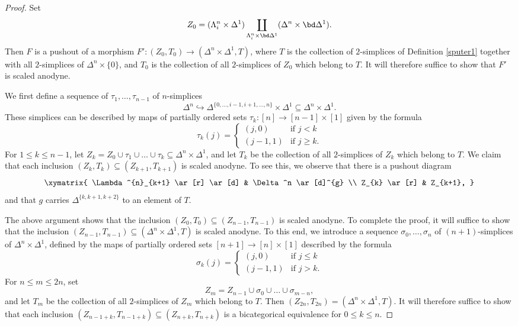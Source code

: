 \begin{proof}
Set
$$ Z_0 =( \Lambda^n_i \times \Delta^1) \coprod_{ \Lambda^n_i \times \bd \Delta^1}
( \Delta^n \times \bd \Delta^1).$$
Then $F$ is a pushout of a morphism
$F' : ( Z_0, T_0) \rightarrow ( \Delta^n \times \Delta^1, T)$, where
$T$ is the collection of $2$-simplices of Definition \ref{sputer1} together with
all $2$-simplices of $\Delta^n \times \{0\}$, and $T_0$ is the collection of all $2$-simplices
of $Z_0$ which belong to $T$. It will therefore suffice to show that $F'$ is scaled anodyne.

We first define a sequence of $\tau_1, \ldots, \tau_{n-1}$ of $n$-simplices
$$ \Delta^n \hookrightarrow \Delta^{ \{ 0, \ldots, i-1, i+1, \ldots, n \} } \times \Delta^1
\subseteq \Delta^n \times \Delta^1.$$
These simplices can be described by maps of partially ordered sets
$\tau_{k}: [n] \rightarrow [n-1] \times [1]$ given by the formula
$$ \tau_{k}(j) = \begin{cases} (j,0) & \text{if } j < k \\
(j-1, 1) & \text{if } j \geq k. \end{cases}$$
For $1 \leq k \leq n-1$, let $Z_{k} = Z_0 \cup \tau_1 \cup \ldots \cup \tau_{ k} \subseteq \Delta^n \times \Delta^1$, and let $T_{k}$ be the collection of all $2$-simplices of $Z_k$ which belong to $T$.
We claim that each inclusion $(Z_k, T_{k}) \subseteq (Z_{k+1}, T_{k+1})$ is scaled anodyne.
To see this, we observe that there is a pushout diagram
$$ \xymatrix{ \Lambda^{n}_{k+1} \ar[r] \ar[d] & \Delta^n \ar[d]^{g} \\
Z_{k} \ar[r] & Z_{k+1}, }$$
and that $g$ carries $\Delta^{ \{k, k+1, k+2\} }$ to an element of $T$. 

The above argument shows that the inclusion $(Z_0, T_0) \subseteq (Z_{n-1}, T_{n-1})$ is scaled anodyne. To complete the proof, it will suffice to show that the inclusion
$(Z_{n-1}, T_{n-1}) \subseteq ( \Delta^n \times \Delta^1, T)$ is scaled anodyne. To this end,
we introduce a sequence $\sigma_0, \ldots, \sigma_n$ of $(n+1)$-simplices of
$\Delta^n \times \Delta^1$, defined by the maps of partially ordered sets $[n+1] \rightarrow [n] \times [1]$ described by the formula
$$ \sigma_{k}(j) = \begin{cases} (j,0) & \text{if } j \leq k \\
(j-1, 1) & \text{if } j > k. \end{cases}$$
For $n \leq m \leq 2n$, set 
$$Z_{m} = Z_{n-1} \cup \sigma_0 \cup \ldots \cup \sigma_{m-n},$$
and let $T_{m}$ be the collection of all $2$-simplices of $Z_{m}$ which belong to $T$.
Then $(Z_{2n}, T_{2n}) = ( \Delta^n \times \Delta^1, T)$. It will therefore suffice to show that
each inclusion $(Z_{n-1+k}, T_{n-1+k}) \subseteq (Z_{n+k}, T_{n+k})$ is a bicategorical equivalence
for $0 \leq k \leq n$.


\end{proof}
